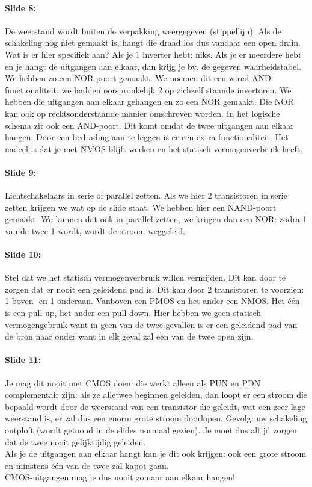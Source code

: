 \documentclass[10pt,a4paper]{book}
\begin{document}
\paragraph{Slide 8:} De weerstand wordt buiten de verpakking weergegeven (stippellijn). Als de schakeling nog niet gemaakt is, hangt die draad los dus vandaar een open drain. Wat is er hier specifiek aan? Als je 1 inverter hebt: niks. Als je er meerdere hebt en je hangt de uitgangen aan elkaar, dan krijg je bv. de gegeven waarheidstabel. We hebben zo een NOR-poort gemaakt. We noemen dit een wired-AND functionaliteit: we hadden oorspronkelijk 2 op zichzelf staande invertoren. We hebben die uitgangen aan elkaar gehangen en zo een NOR gemaakt. Die NOR kan ook op rechtsonderstaande manier omschreven worden. In het logische schema zit ook een AND-poort. Dit komt omdat de twee uitgangen aan elkaar hangen. Door een bedrading aan te leggen is er een extra functionaliteit. Het nadeel is dat je met NMOS blijft werken en het statisch vermogenverbruik heeft.

\paragraph{Slide 9:} Lichtschakelaars in serie of parallel zetten. Als we hier 2 transistoren in serie zetten krijgen we wat op de slide staat. We hebben hier een NAND-poort gemaakt. We kunnen dat ook in parallel zetten, we krijgen dan een NOR: zodra 1 van de twee 1 wordt, wordt de stroom weggeleid.

\paragraph{Slide 10:} Stel dat we het statisch vermogenverbruik willen vermijden. Dit kan door te zorgen dat er nooit een geleidend pad is. Dit kan door 2 transistoren te voorzien: 1 boven- en 1 onderaan. Vanboven een PMOS en het ander een NMOS. Het \'e\'en is een pull up, het ander een pull-down. Hier hebben we geen statisch vermogengebruik want in geen van de twee gevallen is er een geleidend pad van de bron naar onder want in elk geval zal een van de twee open zijn.

\paragraph{Slide 11:} Je mag dit nooit met CMOS doen: die werkt alleen als PUN en PDN complementair zijn: als ze alletwee beginnen geleiden, dan loopt er een stroom die bepaald wordt door de weerstand van een transistor die geleidt, wat een zeer lage weerstand is, er zal dus een enorm grote stroom doorlopen. Gevolg: uw schakeling ontploft (wordt getoond in de slides normaal gezien). Je moet dus altijd zorgen dat de twee nooit gelijktijdig geleiden.\\
Als je de uitgangen aan elkaar hangt kan je dit ook krijgen: ook een grote stroom en minstens \'e\'en van de twee zal kapot gaan.\\ 
CMOS-uitgangen mag je dus nooit zomaar aan elkaar hangen! 
\end{document}

